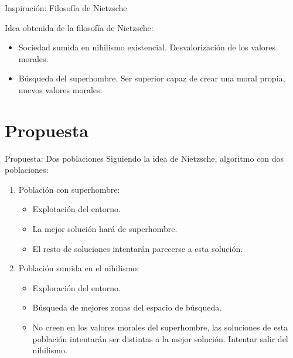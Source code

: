 \documentclass{beamer}
\begin{document}
\begin{frame}{Inspiración: Filosofía de Nietzsche}
\begin{minipage}{0.3\textwidth}
\begin{figure}
    	\end{figure}
    	
    \end{minipage}
    \hfill
	\begin{minipage}{0.65\textwidth}	
    	Idea obtenida de la filosofía de Nietzsche:
    
    	\begin{itemize}
			\item Sociedad sumida en nihilismo existencial. Desvalorización de los valores morales.
			\item Búsqueda del superhombre. Ser superior capaz de crear una moral propia, nuevos valores morales.
    	\end{itemize}
	\end{minipage}
	
\end{frame}
  
  
  
\section{Propuesta}
  
\begin{frame}{Propuesta: Dos poblaciones}
Siguiendo la idea de Nietzsche, algoritmo con dos poblaciones:

\begin{enumerate}
	\item Población con superhombre:
		\begin{itemize}
			\item Explotación del entorno. 
			\item La mejor solución hará de superhombre.
			\item El resto de soluciones intentarán parecerse a esta solución.
		\end{itemize}
	\item Población sumida en el nihilismo: 
		\begin{itemize}
			\item Exploración del entorno.
			\item Búsqueda de mejores zonas del espacio de búsqueda. 
			\item No creen en los valores morales del superhombre, las soluciones de esta población intentarán ser distintas a la mejor solución. Intentar salir del nihilismo.
		\end{itemize}

\end{enumerate}

\end{frame}  
\end{document}
